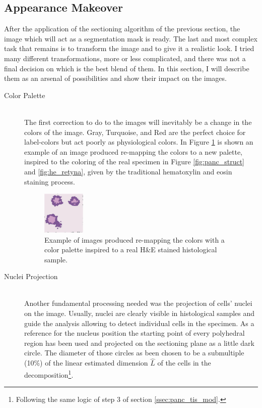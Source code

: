 \documentclass[12pt,a4paper]{report}
\begin{document}
\subsection{Appearance Makeover} \label{ssec:app_mkov}
    After the application of the sectioning algorithm of the previous section, the image which will act as a segmentation mask is ready. The last and most complex task that remains is to transform the image and to give it a realistic look. I tried many different transformations, more or less complicated, and there was not a final decision on which is the best blend of them. In this section, I will describe them as an arsenal of possibilities and show their impact on the images.

    \begin{description}
        \item [Color Palette] \hfill \\
        The first correction to do to the images will inevitably be a change in the colors of the image. Gray, Turquoise, and Red are the perfect choice for label-colors but act poorly as physiological colors. In Figure \ref{fig:new_palette} is shown an example of an image produced re-mapping the colors to a new palette, inspired to the coloring of the real specimen in Figure \ref{fig:panc_struct} and \ref{fig:he_retyna}, given by the traditional hematoxylin and eosin staining process.

        \begin{figure}[h]
            \centering
            \includegraphics[width = 0.2\textwidth]{images/new_palette}
            \caption{Example of images produced re-mapping the colors with a color palette inspired to a real H\&E stained histological sample.}
            \label{fig:new_palette}
        \end{figure}

        \item [Nuclei Projection] \hfill \\
        Another fundamental processing needed was the projection of cells' nuclei on the image. Usually, nuclei are clearly visible in histological samples and guide the analysis allowing to detect individual cells in the specimen. As a reference for the nucleus position the starting point of every polyhedral region has been used and projected on the sectioning plane as a little dark circle. The diameter of those circles as been chosen to be a submultiple (10\%) of the linear estimated dimension $\hat{L}$ of the cells in the decomposition\footnote{Following the same logic of step 3 of section \ref{ssec:panc_tis_mod}.}.


\end{description}
\end{document}
